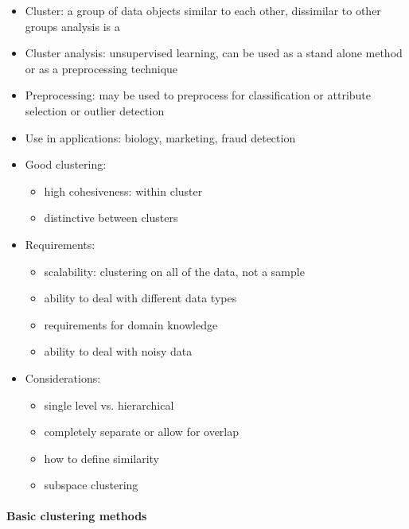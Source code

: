 \documentclass[11pt]{article}
\providecommand{\tightlist}{%
      \setlength{\itemsep}{0pt}\setlength{\parskip}{0pt}}
\begin{document}
    \begin{itemize}
\tightlist
\item
  Cluster: a group of data objects similar to each other, dissimilar to
  other groups analysis is a
\item
  Cluster analysis: unsupervised learning, can be used as a stand alone
  method or as a preprocessing technique
\item
  Preprocessing: may be used to preprocess for classification or
  attribute selection or outlier detection
\item
  Use in applications: biology, marketing, fraud detection
\item
  Good clustering:

  \begin{itemize}
  \tightlist
  \item
    high cohesiveness: within cluster
  \item
    distinctive between clusters
  \end{itemize}
\item
  Requirements:

  \begin{itemize}
  \tightlist
  \item
    scalability: clustering on all of the data, not a sample
  \item
    ability to deal with different data types
  \item
    requirements for domain knowledge
  \item
    ability to deal with noisy data
  \end{itemize}
\item
  Considerations:

  \begin{itemize}
  \tightlist
  \item
    single level vs. hierarchical
  \item
    completely separate or allow for overlap
  \item
    how to define similarity
  \item
    subspace clustering
  \end{itemize}
\end{itemize}

    \paragraph{Basic clustering methods}\label{basic-clustering-methods}
\end{document}

